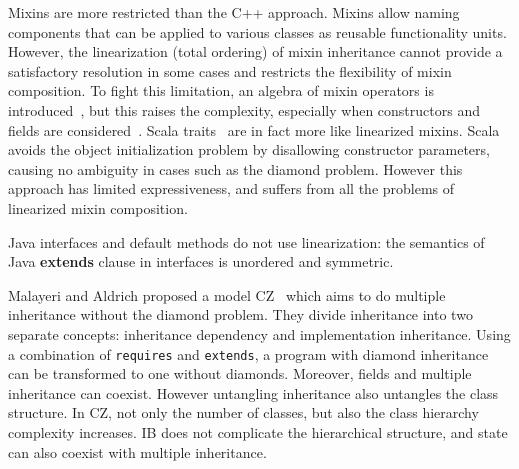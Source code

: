Mixins are more restricted than the C++ approach. Mixins allow naming
components that can be applied to various classes as reusable functionality
units. However, %
the linearization (total ordering) of
mixin inheritance cannot provide a satisfactory resolution in some cases and
restricts the flexibility of mixin composition. To fight this limitation, an
algebra of mixin operators is introduced~\cite{ancona2002calculus}, but this
raises the complexity, especially when constructors and fields
are considered~\cite{marco09FJigsaw}. Scala traits~\cite{scala-overview} are in fact more like linearized mixins.
Scala avoids the object initialization
problem by disallowing constructor parameters, causing no ambiguity in cases
such as the diamond problem. However this approach has limited expressiveness, and
suffers from all the problems of linearized mixin composition. %
\begin{comment}
Python also offers multiple inheritance via linearized mixins. Indeed, in python any class is implicitly a mixin, and mixin composition informally expressed as\\*
\Q@ class A use B,C {...new methods...}@\\*
can be expressed in python as \\*
\Q@ class Aux: ...new methods...@\\*
\Q@ class A(B,C,Aux): pass@
\end{comment}
\noindent Java interfaces and default methods do not use
linearization: the semantics of Java \textbf{extends} clause in
interfaces is unordered and symmetric.


Malayeri and Aldrich proposed a model CZ~\cite{malayeri2009cz} which
aims to do multiple inheritance without the diamond problem. They
divide inheritance into two separate concepts: inheritance dependency
and implementation inheritance. Using a combination of
\texttt{requires} and \texttt{extends}, a program with diamond
inheritance can be transformed to one without diamonds. Moreover,
fields and multiple inheritance can coexist. However untangling
inheritance also untangles the class structure. In CZ, not only the
number of classes, but also the class hierarchy complexity
increases. IB does not complicate the hierarchical structure, and state
can also coexist with multiple inheritance.

